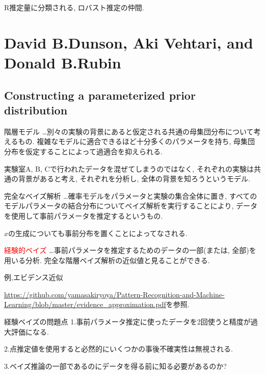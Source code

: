 \documentclass[11pt,a4pape,dvipdfmx]{jarticle}
\newcommand{\tcr}[1]{\textcolor{red}{#1}}
\begin{document}
R推定量に分類される, ロバスト推定の仲間.



\section{David B.Dunson, Aki Vehtari, and Donald B.Rubin}

\subsection{Constructing a parameterized prior distribution}
\begin{itembox}[l]{階層モデル}
…別々の実験の背景にあると仮定される共通の母集団分布について考えるもの.
複雑なモデルに適合できるほど十分多くのパラメータを持ち, 母集団分布を仮定することによって過適合を抑えられる.
\end{itembox}

実験室A, B, Cで行われたデータを混ぜてしまうのではなく, それぞれの実験は共通の背景があると考え, それぞれを分析し, 全体の背景を知ろうというモデル.


\begin{itembox}[l]{完全なベイズ解析}
…確率モデルをパラメータと実験の集合全体に置き, すべてのモデルパラメータの結合分布についてベイズ解析を実行することにより, データを使用して事前パラメータを推定するというもの.
\end{itembox}

$x$の生成についても事前分布を置くことによってなされる.

\begin{itembox}[l]{\tcr{経験的ベイズ}}
…事前パラメータを推定するためのデータの一部(または, 全部)を用いる分析.
完全な階層ベイズ解析の近似値と見ることができる.
\end{itembox}

例,エビデンス近似

\url{https://github.com/yamasakiryoya/Pattern-Recognition-and-Machine-Learning/blob/master/evidence_approximation.pdf}を参照.



\begin{itembox}[l]{経験ベイズの問題点}
1.事前パラメータ推定に使ったデータを2回使うと精度が過大評価になる.

2.点推定値を使用すると必然的にいくつかの事後不確実性は無視される.

3.ベイズ推論の一部であるのにデータを得る前に知る必要があるのか?
\end{itembox}
\end{document}
